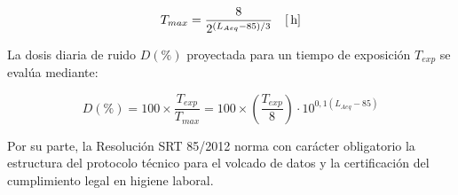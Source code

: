 \begin{equation}
\label{eq.ej1:tmax}
T_{max} = \frac{8}{2^{(L_{Aeq} - 85)/3}} \quad [\,\mathrm{h}]
\end{equation}

La dosis diaria de ruido $D(\%)$ proyectada para un tiempo de exposición $T_{exp}$ se evalúa mediante:

\begin{equation}
\label{eq.ej1:dosis}
D(\%) = 100 \times \frac{T_{exp}}{T_{max}} = 100 \times \left( \frac{T_{exp}}{8} \right) \cdot 10^{0,1 (L_{Aeq} - 85)}
\end{equation}

Por su parte, la Resolución SRT 85/2012 norma con carácter obligatorio la estructura del protocolo técnico para
el volcado de datos y la certificación del cumplimiento legal en higiene laboral.

